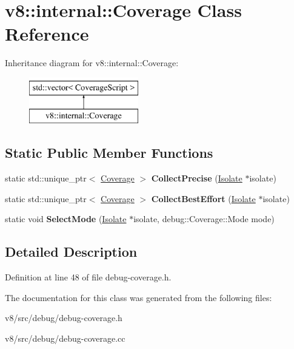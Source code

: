 \hypertarget{classv8_1_1internal_1_1Coverage}{}\section{v8\+:\+:internal\+:\+:Coverage Class Reference}
\label{classv8_1_1internal_1_1Coverage}
Inheritance diagram for v8\+:\+:internal\+:\+:Coverage\+:\begin{figure}[H]
\begin{center}
\leavevmode
\includegraphics[height=2.000000cm]{classv8_1_1internal_1_1Coverage}
\end{center}
\end{figure}
\subsection*{Static Public Member Functions}
\begin{DoxyCompactItemize}
\item 
\mbox{\label{classv8_1_1internal_1_1Coverage_a11bcbe58ca9413cbb7572b86882649fd}} 
static std\+::unique\+\_\+ptr$<$ \mbox{\hyperlink{classv8_1_1internal_1_1Coverage}{Coverage}} $>$ {\bfseries Collect\+Precise} (\mbox{\hyperlink{classv8_1_1internal_1_1Isolate}{Isolate}} $\ast$isolate)
\item 
\mbox{\label{classv8_1_1internal_1_1Coverage_af5201ef7727bf3071a6b3420a232565a}} 
static std\+::unique\+\_\+ptr$<$ \mbox{\hyperlink{classv8_1_1internal_1_1Coverage}{Coverage}} $>$ {\bfseries Collect\+Best\+Effort} (\mbox{\hyperlink{classv8_1_1internal_1_1Isolate}{Isolate}} $\ast$isolate)
\item 
\mbox{\label{classv8_1_1internal_1_1Coverage_a19f1435d67b1118675b1e6b8fc5495fa}} 
static void {\bfseries Select\+Mode} (\mbox{\hyperlink{classv8_1_1internal_1_1Isolate}{Isolate}} $\ast$isolate, debug\+::\+Coverage\+::\+Mode mode)
\end{DoxyCompactItemize}


\subsection{Detailed Description}


Definition at line 48 of file debug-\/coverage.\+h.



The documentation for this class was generated from the following files\+:\begin{DoxyCompactItemize}
\item 
v8/src/debug/debug-\/coverage.\+h\item 
v8/src/debug/debug-\/coverage.\+cc\end{DoxyCompactItemize}
